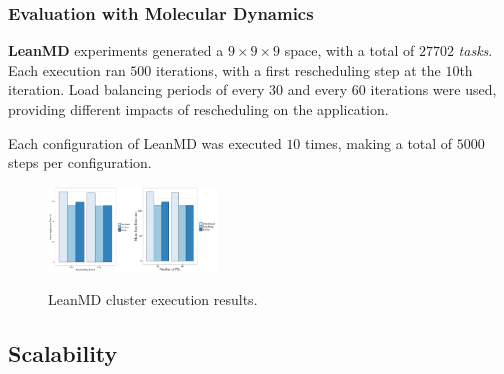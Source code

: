 \subsubsection*{Evaluation with Molecular Dynamics}

\textbf{LeanMD} experiments generated a $9\times9\times9$ space, with a total of $27702$ \textit{tasks}.
Each execution ran $500$ iterations, with a first rescheduling step at the $10$th iteration. 
Load balancing periods of every $30$ and every $60$ iterations were used, providing different impacts of rescheduling on the application.

Each configuration of LeanMD was executed $10$ times, making a total of $5000$ steps per configuration. 

\begin{figure}
	\centering
    \includegraphics[width=0.2\textwidth]{images/apptime_leanmd_g5k.pdf}\includegraphics[width=0.2\textwidth]{images/steptime_leanmd_g5k.pdf}
    \caption{LeanMD cluster execution results.}
    \label{fig:eval:g5k:leanmd:time}
\end{figure}

\subsection{Scalability}